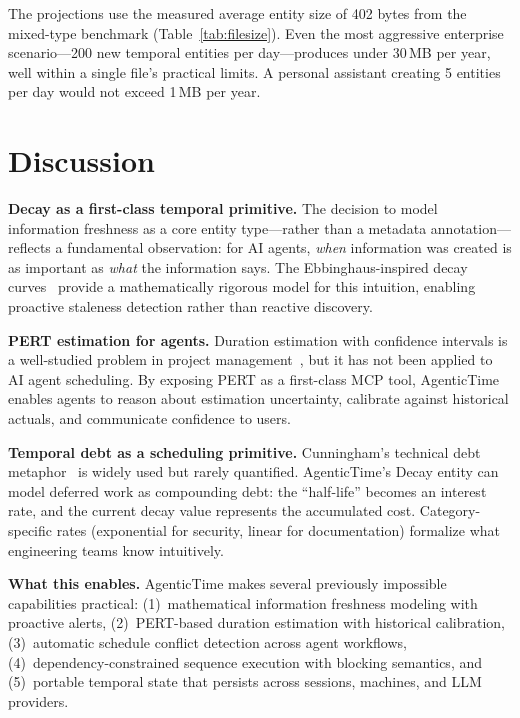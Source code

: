 \documentclass[10pt, twocolumn]{article}
\begin{document}
The projections use the measured average entity size of 402 bytes from the mixed-type benchmark (Table~\ref{tab:filesize}). Even the most aggressive enterprise scenario---200 new temporal entities per day---produces under 30\,MB per year, well within a single file's practical limits. A personal assistant creating 5 entities per day would not exceed 1\,MB per year.


\section{Discussion}
\label{sec:discussion}

\textbf{Decay as a first-class temporal primitive.} The decision to model information freshness as a core entity type---rather than a metadata annotation---reflects a fundamental observation: for AI agents, \emph{when} information was created is as important as \emph{what} the information says. The Ebbinghaus-inspired decay curves~\cite{ebbinghaus1885, wixted2004psychology} provide a mathematically rigorous model for this intuition, enabling proactive staleness detection rather than reactive discovery.

\textbf{PERT estimation for agents.} Duration estimation with confidence intervals is a well-studied problem in project management~\cite{pert1959, pinedo2016scheduling}, but it has not been applied to AI agent scheduling. By exposing PERT as a first-class MCP tool, AgenticTime enables agents to reason about estimation uncertainty, calibrate against historical actuals, and communicate confidence to users.

\textbf{Temporal debt as a scheduling primitive.} Cunningham's technical debt metaphor~\cite{cunningham1992wycash} is widely used but rarely quantified. AgenticTime's Decay entity can model deferred work as compounding debt: the ``half-life'' becomes an interest rate, and the current decay value represents the accumulated cost. Category-specific rates (exponential for security, linear for documentation) formalize what engineering teams know intuitively.

\textbf{What this enables.} AgenticTime makes several previously impossible capabilities practical: (1)~mathematical information freshness modeling with proactive alerts, (2)~PERT-based duration estimation with historical calibration, (3)~automatic schedule conflict detection across agent workflows, (4)~dependency-constrained sequence execution with blocking semantics, and (5)~portable temporal state that persists across sessions, machines, and LLM providers.
\end{document}

